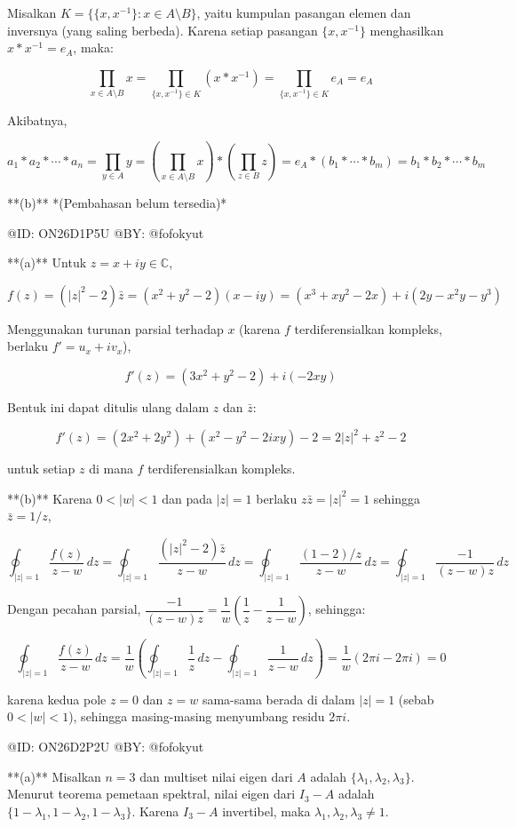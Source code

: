 Misalkan $K = \{\{x, x^{-1}\} : x \in A\setminus B\}$, yaitu kumpulan pasangan elemen dan inversnya (yang saling berbeda). Karena setiap pasangan $\{x,x^{-1}\}$ menghasilkan $x * x^{-1} = e_A$, maka:

$$
\prod_{x \in A\setminus B} x = \prod_{\{x,x^{-1}\}\in K} (x * x^{-1}) = \prod_{\{x,x^{-1}\}\in K} e_A = e_A
$$

Akibatnya,

$$
a_1 * a_2 * \cdots * a_n = \prod_{y \in A} y = \left(\prod_{x \in A\setminus B} x\right)*\left(\prod_{z \in B} z\right) = e_A * (b_1 * \cdots * b_m) = b_1 * b_2 * \cdots * b_m
$$

**(b)** *(Pembahasan belum tersedia)*

@ID: ON26D1P5U
@BY: @fofokyut

**(a)** Untuk $z = x+iy \in \mathbb{C}$,

$$
f(z) = (|z|^2-2)\bar z = (x^2+y^2-2)(x-iy) = (x^3+xy^2-2x) + i(2y - x^2y - y^3)
$$

Menggunakan turunan parsial terhadap $x$ (karena $f$ terdiferensialkan kompleks, berlaku $f' = u_x + iv_x$),

$$
f'(z) = (3x^2+y^2-2) + i(-2xy)
$$

Bentuk ini dapat ditulis ulang dalam $z$ dan $\bar z$:

$$
f'(z) = (2x^2+2y^2) + (x^2-y^2-2ixy) - 2 = 2|z|^2 + z^2 - 2
$$

untuk setiap $z$ di mana $f$ terdiferensialkan kompleks.

**(b)** Karena $0<|w|<1$ dan pada $|z|=1$ berlaku $z\bar z = |z|^2 = 1$ sehingga $\bar z = 1/z$,

$$
\oint_{|z|=1} \frac{f(z)}{z-w}\,dz = \oint_{|z|=1} \frac{(|z|^2-2)\bar z}{z-w}\,dz = \oint_{|z|=1} \frac{(1-2)/z}{z-w}\,dz = \oint_{|z|=1} \frac{-1}{(z-w)z}\,dz
$$

Dengan pecahan parsial, $\dfrac{-1}{(z-w)z} = \dfrac{1}{w}\left(\dfrac{1}{z}-\dfrac{1}{z-w}\right)$, sehingga:

$$
\oint_{|z|=1} \frac{f(z)}{z-w}\,dz = \frac{1}{w}\left(\oint_{|z|=1}\frac{1}{z}\,dz - \oint_{|z|=1}\frac{1}{z-w}\,dz\right) = \frac{1}{w}(2\pi i - 2\pi i) = 0
$$

karena kedua pole $z=0$ dan $z=w$ sama-sama berada di dalam $|z|=1$ (sebab $0<|w|<1$), sehingga masing-masing menyumbang residu $2\pi i$.

@ID: ON26D2P2U
@BY: @fofokyut

**(a)** Misalkan $n=3$ dan multiset nilai eigen dari $A$ adalah $\{\lambda_1,\lambda_2,\lambda_3\}$. Menurut teorema pemetaan spektral, nilai eigen dari $I_3-A$ adalah $\{1-\lambda_1,1-\lambda_2,1-\lambda_3\}$. Karena $I_3-A$ invertibel, maka $\lambda_1,\lambda_2,\lambda_3 \ne 1$.

